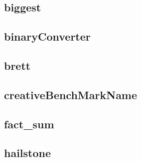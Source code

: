 \newpage
\subsection{biggest}
    \begin{figure}[h]
	    \centering
		
	\end{figure}
    


\newpage
\subsection{binaryConverter}
    \begin{figure}[h]
	    \centering
		
	\end{figure}
    


\newpage
\subsection{brett}
    \begin{figure}[h]
	    \centering
		
	\end{figure}
    


\newpage
\subsection{creativeBenchMarkName}
    \begin{figure}[h]
	    \centering
		
	\end{figure}
    


\newpage
\subsection{fact\_sum}
    \begin{figure}[h]
	    \centering
		
	\end{figure}
    


\newpage
\subsection{hailstone}
    \begin{figure}[h]
	    \centering
		
	\end{figure}
    


\newpage
